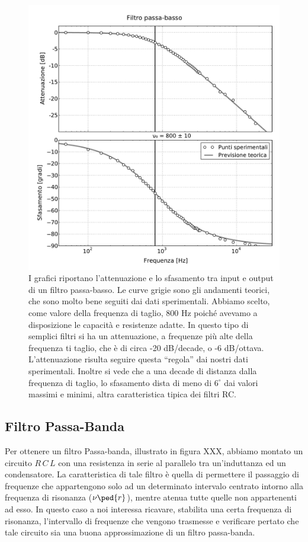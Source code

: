 \begin{figure}
  \includegraphics[scale=0.55]{passa_basso.pdf}
  \caption{I grafici riportano l'attenuazione e lo sfasamento tra input e output di un filtro passa-basso.
    Le curve grigie sono gli andamenti teorici, che sono molto bene seguiti dai dati sperimentali. Abbiamo
    scelto, come valore della frequenza di taglio, 800 Hz poiché avevamo a disposizione le capacità
    e resistenze adatte. In questo tipo di semplici filtri si ha un attenuazione, a frequenze più alte della
    frequenza ti taglio, che è di circa -20 dB/decade, o -6 dB/ottava. L'attenuazione risulta seguire questa
    ``regola'' dai nostri dati sperimentali. Inoltre si vede che a una decade di distanza dalla frequenza di taglio,
    lo sfasamento dista di meno di $6^\circ$ dai valori massimi e minimi, altra caratteristica tipica dei filtri RC.}
  \label{fig:g_basso}
\end{figure}

\subsection*{Filtro Passa-Banda}


Per ottenere un filtro Passa-banda, illustrato in figura XXX, abbiamo montato un circuito $R\,C\,L$ con una resistenza in serie al parallelo tra un'induttanza ed un condensatore.
La caratteristica di tale filtro è quella di permettere il passaggio di frequenze che appartengono solo ad un determinato intervalo centrato intorno alla frequenza di risonanza ($\nu\ped{r}$), mentre atenua tutte quelle non appartenenti ad esso.
In questo caso a noi interessa ricavare, stabilita una certa frequenza di risonanza, l'intervallo di frequenze che vengono trasmesse e verificare pertato che tale circuito sia una buona approssimazione di un filtro passa-banda.


